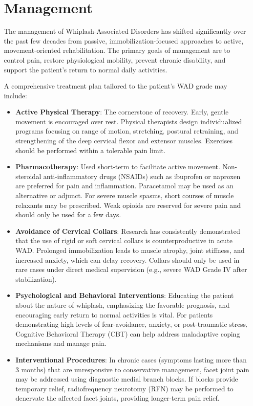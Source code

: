 \section*{Management}
The management of Whiplash-Associated Disorders has shifted significantly over the past few decades from passive, immobilization-focused approaches to active, movement-oriented rehabilitation. The primary goals of management are to control pain, restore physiological mobility, prevent chronic disability, and support the patient's return to normal daily activities.

A comprehensive treatment plan tailored to the patient's WAD grade may include:
\begin{itemize}
    \item \textbf{Active Physical Therapy}: The cornerstone of recovery. Early, gentle movement is encouraged over rest. Physical therapists design individualized programs focusing on range of motion, stretching, postural retraining, and strengthening of the deep cervical flexor and extensor muscles. Exercises should be performed within a tolerable pain limit.
    \item \textbf{Pharmacotherapy}: Used short-term to facilitate active movement. Non-steroidal anti-inflammatory drugs (NSAIDs) such as ibuprofen or naproxen are preferred for pain and inflammation. Paracetamol may be used as an alternative or adjunct. For severe muscle spasms, short courses of muscle relaxants may be prescribed. Weak opioids are reserved for severe pain and should only be used for a few days.
    \item \textbf{Avoidance of Cervical Collars}: Research has consistently demonstrated that the use of rigid or soft cervical collars is counterproductive in acute WAD. Prolonged immobilization leads to muscle atrophy, joint stiffness, and increased anxiety, which can delay recovery. Collars should only be used in rare cases under direct medical supervision (e.g., severe WAD Grade IV after stabilization).
    \item \textbf{Psychological and Behavioral Interventions}: Educating the patient about the nature of whiplash, emphasizing the favorable prognosis, and encouraging early return to normal activities is vital. For patients demonstrating high levels of fear-avoidance, anxiety, or post-traumatic stress, Cognitive Behavioral Therapy (CBT) can help address maladaptive coping mechanisms and manage pain.
    \item \textbf{Interventional Procedures}: In chronic cases (symptoms lasting more than 3 months) that are unresponsive to conservative management, facet joint pain may be addressed using diagnostic medial branch blocks. If blocks provide temporary relief, radiofrequency neurotomy (RFN) may be performed to denervate the affected facet joints, providing longer-term pain relief.
\end{itemize}

